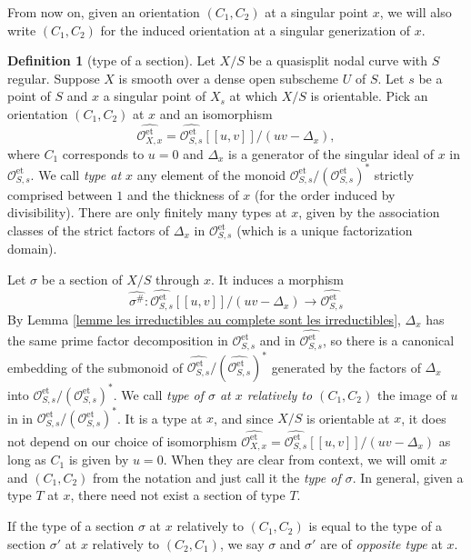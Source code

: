 \documentclass[a4paper,10pt,twoside]{article}
\newcommand{\on}[1]{\operatorname{#1}}
\renewcommand{\O}{\mathcal{O}}
\theoremstyle{definition}
\newtheorem{defi}[thm]{Definition}
\theoremstyle{remark}
\renewcommand{\on}[1]{\operatorname{#1}}
\begin{document}
From now on, given an orientation $(C_1,C_2)$ at a singular point $x$, we will also write $(C_1,C_2)$ for the induced orientation at a singular generization of $x$.


\begin{defi}[type of a section]\label{definition:type_of_section}
Let $X/S$ be a quasisplit nodal curve with $S$ regular. Suppose $X$ is smooth over a dense open subscheme $U$ of $S$. Let $s$ be a point of $S$ and $x$ a singular point of $X_s$ at which $X/S$ is orientable. Pick an orientation $(C_1,C_2)$ at $x$ and an isomorphism
\[
\widehat{\O_{X,x}^{\on{et}}}=\widehat{\O_{S,s}^{\on{et}}}[[u,v]]/(uv-\Delta_x),
\]
where $C_1$ corresponds to $u=0$ and $\Delta_x$ is a generator of the singular ideal of $x$ in $\O_{S,s}^{\on{et}}$. We call \emph{type at $x$} any element of the monoid $\O_{S,s}^{\on{et}}/(\O_{S,s}^{\on{et}})^*$ strictly comprised between $1$ and the thickness of $x$ (for the order induced by divisibility). There are only finitely many types at $x$, given by the association classes of the strict factors of $\Delta_x$ in $\O_{S,s}^{\on{et}}$ (which is a unique factorization domain).

Let $\sigma$ be a section of $X/S$ through $x$. It induces a morphism
\[
\widehat{\sigma^\#} \colon \widehat{\O_{S,s}^{\on{et}}}[[u,v]]/(uv-\Delta_x) \to \widehat{\O_{S,s}^{\on{et}}}
\]
By Lemma \ref{lemme les irreductibles au complete sont les irreductibles}, $\Delta_x$ has the same prime factor decomposition in $\O_{S,s}^{\on{et}}$ and in $\widehat{\O_{S,s}^{\on{et}}}$, so there is a canonical embedding of the submonoid of $\widehat{\O_{S,s}^{\on{et}}}/(\widehat{\O_{S,s}^{\on{et}}})^*$ generated by the factors of $\Delta_x$ into $\O_{S,s}^{\on{et}}/(\O_{S,s}^{\on{et}})^*$. We call \emph{type of $\sigma$ at $x$ relatively to $(C_1,C_2)$} the image of $u$ in in $\O_{S,s}^{\on{et}}/(\O_{S,s}^{\on{et}})^*$. It is a type at $x$, and since $X/S$ is orientable at $x$, it does not depend on our choice of isomorphism $\widehat{\O_{X,x}^{\on{et}}}=\widehat{\O_{S,s}^{\on{et}}}[[u,v]]/(uv-\Delta_x)$ as long as $C_1$ is given by $u=0$. When they are clear from context, we will omit $x$ and $(C_1,C_2)$ from the notation and just call it the \emph{type of $\sigma$}. In general, given a type $T$ at $x$, there need not exist a section of type $T$.

If the type of a section $\sigma$ at $x$ relatively to $(C_1,C_2)$ is equal to the type of a section $\sigma'$ at $x$ relatively to $(C_2,C_1)$, we say $\sigma$ and $\sigma'$ are of \emph{opposite type} at $x$.
\end{defi}
\end{document}

